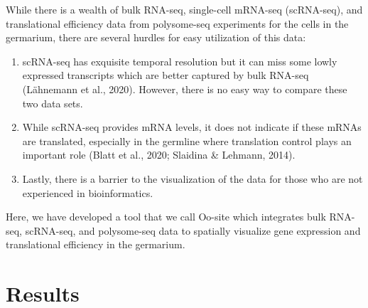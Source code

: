 \documentclass[12pt,oneside]{reedthesis}
\begin{document}
While there is a wealth of bulk RNA-seq, single-cell mRNA-seq
(scRNA-seq), and translational efficiency data from polysome-seq
experiments for the cells in the germarium, there are several hurdles
for easy utilization of this data:
\begin{enumerate}
\def\labelenumi{\arabic{enumi}.}
\item
  scRNA-seq has exquisite temporal resolution but it can miss some
  lowly expressed transcripts which are better captured by bulk
  RNA-seq (Lähnemann et al., 2020). However, there is
  no easy way to compare these two data sets.
\item
  While scRNA-seq provides mRNA levels, it does not indicate if these
  mRNAs are translated, especially in the germline where translation
  control plays an important role
  (Blatt et al., 2020; Slaidina \& Lehmann, 2014).
\item
  Lastly, there is a barrier to the visualization of the data for
  those who are not experienced in bioinformatics.
\end{enumerate}
Here, we have developed a tool that we call Oo-site which integrates
bulk RNA-seq, scRNA-seq, and polysome-seq data to spatially visualize
gene expression and translational efficiency in the germarium.

\hypertarget{results-1}{%
\section{Results}\label{results-1}}
\end{document}
